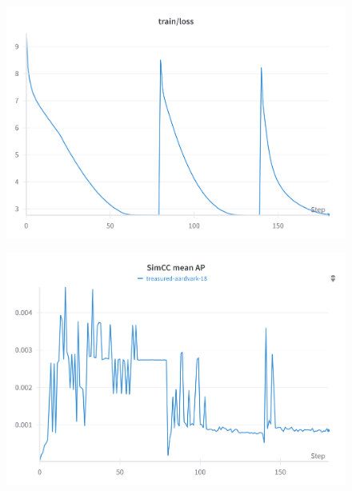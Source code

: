 \begin{figure}[htp]
\begin{minipage}[b]{0.32\linewidth}
    \label{fig:ap50_base}
  \end{minipage}

  \vspace{1ex}  %

  \begin{minipage}[b]{0.32\linewidth}
    \centering
    \includegraphics[width=\linewidth]{figures/loss_SimCC.png}
    \label{fig:loss_simcc}
  \end{minipage}
  \hfill
  \begin{minipage}[b]{0.32\linewidth}
    \centering
    \includegraphics[width=\linewidth]{figures/mAP_SimCC.png}
    \label{fig:map_simcc}
  \end{minipage}
  \hfill
  \begin{minipage}[b]{0.32\linewidth}

\end{minipage}
\end{figure}
